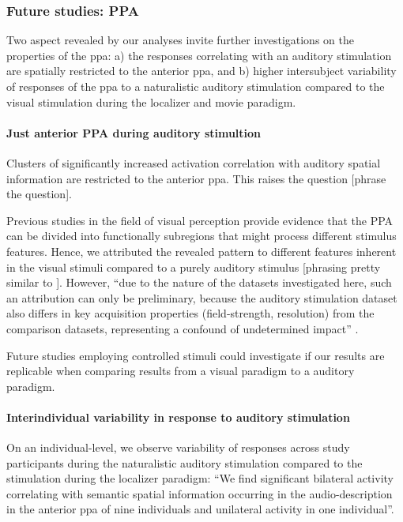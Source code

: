 \subsubsection{Future studies: PPA}

%
Two aspect revealed by our analyses invite further investigations on the
properties of the \ac{ppa}:
%
a) the responses correlating with an auditory stimulation are spatially
restricted to the anterior \ac{ppa}, and
%
b) higher intersubject variability of responses of the \ac{ppa} to a
naturalistic auditory stimulation compared to the visual stimulation during the
localizer and movie paradigm.


\paragraph{Just anterior PPA during auditory stimultion}


Clusters of significantly increased activation correlation with auditory spatial
information are restricted to the anterior \ac{ppa}.
This raises the question [phrase the question].

Previous studies in the field of visual perception provide evidence that the PPA
can be divided into functionally subregions that might process different
stimulus features.
%
Hence, we attributed the revealed pattern to different features inherent in the
visual stimuli compared to a purely auditory stimulus [phrasing pretty similar
to \citep{haeusler2022processing}].
%
However, ``due to the nature of the datasets investigated here, such an
attribution can only be preliminary, because the auditory stimulation dataset
also differs in key acquisition properties (field-strength, resolution) from the
comparison datasets, representing a confound of undetermined impact''
\citep{haeusler2022processing}.

Future studies employing controlled stimuli could investigate if our results are
replicable when comparing results from a visual paradigm to a auditory paradigm.



\paragraph{Interindividual variability in response to auditory stimulation}

On an individual-level, we observe variability of responses across study
participants during the naturalistic auditory stimulation compared to the
stimulation during the localizer paradigm:
%
``We find significant bilateral activity correlating with semantic spatial
information occurring in the audio-description in the anterior \ac{ppa} of nine
individuals and unilateral activity in one individual''.

